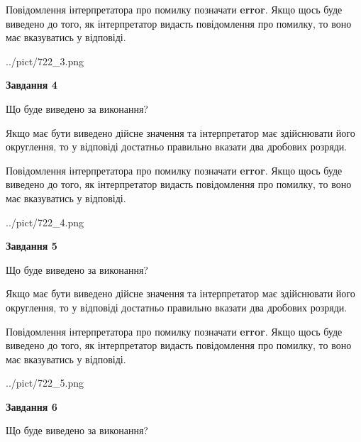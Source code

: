 \documentclass[12pt, ukrainian]{article}
\begin{document}
{\begin {Large}
Повідомлення інтерпретатора про помилку позначати \textbf{error}.
Якщо щось буде виведено до того, як інтерпретатор видасть повідомлення про помилку, 
то воно має вказуватись у відповіді. \par

\begin{center}
	{../pict/722_3.png}
\end{center}
\newpage

{\begin {center}\textbf{Завдання 4}\end {center}}\par
Що буде виведено за виконання? \par

Якщо має бути виведено дійсне значення та інтерпретатор має здійснювати його округлення, 
то у відповіді достатньо правильно вказати два дробових розряди.

Повідомлення інтерпретатора про помилку позначати \textbf{error}.
Якщо щось буде виведено до того, як інтерпретатор видасть повідомлення про помилку, 
то воно має вказуватись у відповіді. \par

\begin{center}
	{../pict/722_4.png}
\end{center}
\newpage

{\begin {center}\textbf{Завдання 5}\end {center}}\par
Що буде виведено за виконання? \par

Якщо має бути виведено дійсне значення та інтерпретатор має здійснювати його округлення, 
то у відповіді достатньо правильно вказати два дробових розряди.

Повідомлення інтерпретатора про помилку позначати \textbf{error}.
Якщо щось буде виведено до того, як інтерпретатор видасть повідомлення про помилку, 
то воно має вказуватись у відповіді. \par

\begin{center}
	{../pict/722_5.png}
\end{center}
\newpage

{\begin {center}\textbf{Завдання 6}\end {center}}\par
Що буде виведено за виконання? \par


\end{Large}}
\end{document}
